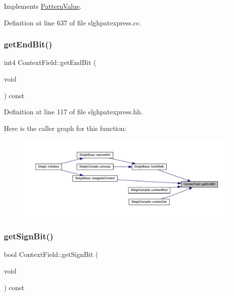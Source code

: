 Implements \mbox{\hyperlink{class_pattern_value_acc5a0c3b740a93e6ed5d3882c960ef98}{Pattern\+Value}}.



Definition at line 637 of file slghpatexpress.\+cc.

\mbox{\label{class_context_field_a5796a7644818d7a95373bb14a19aca8a}} 
\subsubsection{\texorpdfstring{getEndBit()}{getEndBit()}}
{\footnotesize\ttfamily int4 Context\+Field\+::get\+End\+Bit (\begin{DoxyParamCaption}\item[{void}]{ }\end{DoxyParamCaption}) const\hspace{0.3cm}{\ttfamily [inline]}}



Definition at line 117 of file slghpatexpress.\+hh.

Here is the caller graph for this function\+:
\nopagebreak
\begin{figure}[H]
\begin{center}
\leavevmode
\includegraphics[width=350pt]{class_context_field_a5796a7644818d7a95373bb14a19aca8a_icgraph}
\end{center}
\end{figure}
\mbox{\label{class_context_field_a13700f86da50a8e534d19e63a0b4658d}} 
\subsubsection{\texorpdfstring{getSignBit()}{getSignBit()}}
{\footnotesize\ttfamily bool Context\+Field\+::get\+Sign\+Bit (\begin{DoxyParamCaption}\item[{void}]{ }\end{DoxyParamCaption}) const\hspace{0.3cm}{\ttfamily [inline]}}



